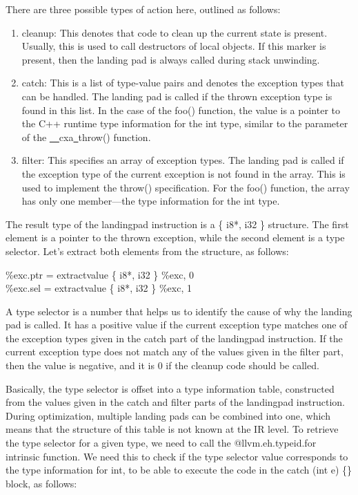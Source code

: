 There are three possible types of action here, outlined as follows:\par

\begin{enumerate}
	\item cleanup: This denotes that code to clean up the current state is present. Usually, this is used to call destructors of local objects. If this marker is present, then the landing pad is always called during stack unwinding.
	\item catch: This is a list of type-value pairs and denotes the exception types that can be handled. The landing pad is called if the thrown exception type is found in this list. In the case of the foo() function, the value is a pointer to the C++ runtime type information for the int type, similar to the parameter of the \underline{~~}cxa\underline{~}throw() function.
	\item filter: This specifies an array of exception types. The landing pad is called if the exception type of the current exception is not found in the array. This is used to implement the throw() specification. For the foo() function, the array has only one member—the type information for the int type.
\end{enumerate}

The result type of the landingpad instruction is a \{ i8*, i32 \} structure. The first element is a pointer to the thrown exception, while the second element is a type selector. Let's extract both elements from the structure, as follows:\par

\begin{tcolorbox}[colback=white,colframe=black]
\%exc.ptr = extractvalue \{ i8*, i32 \} \%exc, 0 \\
\%exc.sel = extractvalue \{ i8*, i32 \} \%exc, 1
\end{tcolorbox}

A type selector is a number that helps us to identify the cause of why the landing pad is called. It has a positive value if the current exception type matches one of the exception types given in the catch part of the landingpad instruction. If the current exception type does not match any of the values given in the filter part, then the value is negative, and it is 0 if the cleanup code should be called.\par

Basically, the type selector is offset into a type information table, constructed from the values given in the catch and filter parts of the landingpad instruction. During optimization, multiple landing pads can be combined into one, which means that the structure of this table is not known at the IR level. To retrieve the type selector for a given type, we need to call the @llvm.eh.typeid.for intrinsic function. We need this to check if the type selector value corresponds to the type information for int, to be able to execute the code in the catch (int e) \{\} block, as follows:\par

